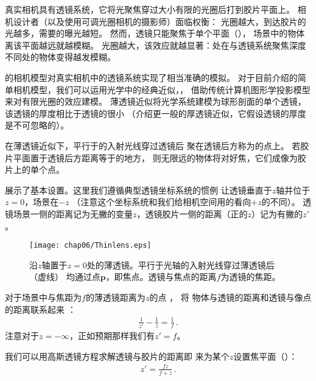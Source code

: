 真实相机具有透镜系统，它将光聚焦穿过大小有限的光圈后打到胶片平面上。
相机设计者（以及使用可调光圈相机的摄影师）面临权衡：
光圈越大，到达胶片的光越多，需要的曝光越短。
然而，透镜只能聚焦于单个平面（），
场景中的物体离该平面越远就越模糊。
光圈越大，该效应就越显著：处在与透镜系统聚焦深度不同处的物体变得越发模糊。

的相机模型对真实相机中的透镜系统实现了相当准确的模拟。
对于目前介绍的简单相机模型，我们可以运用光学中的经典近似，，
借助传统计算机图形学投影模型来对有限光圈的效应建模。
薄透镜近似将光学系统建模为球形剖面的单个透镜，
该透镜的厚度相比于透镜的很小
（介绍更一般的厚透镜近似，它假设透镜的厚度是不可忽略的）。

在薄透镜近似下，平行于的入射光线穿过透镜后
聚在透镜后方称为的点上。
若胶片平面置于透镜后方距离等于的地方，
则无限远的物体将对好焦，它们成像为胶片上的单个点。

展示了基本设置。这里我们遵循典型透镜坐标系统的惯例
让透镜垂直于$z$轴并位于$z=0$，场景在$-z$
（注意这个坐标系统和我们给相机空间用的看向$+z$的不同）。
透镜场景一侧的距离记为无撇的变量$z$，透镜胶片一侧的距离（正的$z$）记为有撇的$z'$。
\begin{figure}[htbp]
    \centering\texttt{[image: chap06/Thinlens.eps]}
    \caption{沿$z$轴置于$z=0$处的薄透镜。平行于光轴的入射光线穿过薄透镜后（虚线）
        均通过点$\bm p$，即焦点。透镜与焦点的距离$f$为透镜的焦距。}
    \label{fig:6.6}
\end{figure}

对于场景中与焦距为$f$的薄透镜距离为$z$的点
，
将
物体与透镜的距离和透镜与像点的距离联系起来
：
\begin{align}\label{eq:6.1}
    \frac{1}{z'}-\frac{1}{z}=\frac{1}{f}\, .
\end{align}
注意对于$z=-\infty$，正如预期那样我们有$z'=f$。

我们可以用高斯透镜方程求解透镜与胶片的距离即
来为某个$z$设置焦平面（）：
\begin{align}\label{eq:6.2}
    z'=\frac{fz}{f+z}\, .
\end{align}

